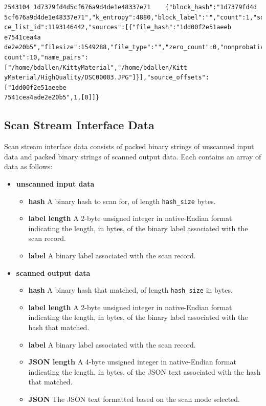 \documentclass[11pt,fleqn]{article} %
\begin{document}
\lstset{style=customfile}
\begin{lstlisting}[float, caption={Example output from a scan match}, label=ScanDataWithPath]
2543104	1d7379fd4d5cf676a9d4de1e48337e71	{"block_hash":"1d7379fd4d
5cf676a9d4de1e48337e71","k_entropy":4880,"block_label":"","count":1,"sour
ce_list_id":1193146442,"sources":[{"file_hash":"1dd00f2e51aeeb e7541cea4a
de2e20b5","filesize":1549288,"file_type":"","zero_count":0,"nonprobative_
count":10,"name_pairs":["/home/bdallen/KittyMaterial","/home/bdallen/Kitt
yMaterial/HighQuality/DSC00003.JPG"]}],"source_offsets":["1dd00f2e51aeebe
7541cea4ade2e20b5",1,[0]]}
\end{lstlisting}

\subsection{Scan Stream Interface Data}
Scan stream interface data consists of packed binary strings of unscanned input data and packed binary strings of scanned output data. Each contains an array of data as follows:\\
\begin{itemize}
\item \textbf{unscanned input data}
  \begin{itemize}
  \item \textbf{hash} A binary hash to scan for, of length \verb+hash_size+ bytes.
  \item \textbf{label length} A 2-byte unsigned integer in native-Endian format indicating the length, in bytes, of the binary label associated with the scan record.
  \item \textbf{label} A binary label associated with the scan record.
  \end{itemize}
\item \textbf{scanned output data}
  \begin{itemize}
  \item \textbf{hash} A binary hash that matched, of length \verb+hash_size+ in bytes.
  \item \textbf{label length} A 2-byte unsigned integer in native-Endian format indicating the length, in bytes, of the binary label associated with the hash that matched.
  \item \textbf{label} A binary label associated with the scan record.
  \item \textbf{JSON length} A 4-byte unsigned integer in native-Endian format indicating the length, in bytes, of the JSON text associated with the hash that matched.
  \item \textbf{JSON} The JSON text formatted based on the scan mode selected.
  \end{itemize}
\end{itemize}
\end{document}
